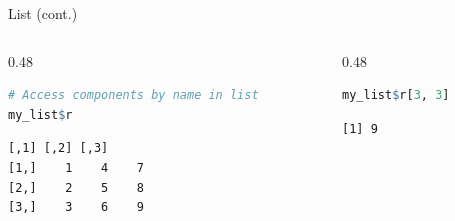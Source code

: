 \begin{frame}[fragile]{List (cont.)}
\begin{columns}[T]
\begin{column}{0.48\textwidth}
\begin{lstlisting}[language=R]
# Access components by name in list
my_list$r
\end{lstlisting}
\begin{lstlisting}[style=output]
     [,1] [,2] [,3]
[1,]    1    4    7
[2,]    2    5    8
[3,]    3    6    9
\end{lstlisting}
\end{column}
\begin{column}{0.48\textwidth}
\begin{lstlisting}[language=R]
my_list$r[3, 3]
\end{lstlisting}
\begin{lstlisting}[style=output]
[1] 9
\end{lstlisting}
\end{column}
\end{columns}
\end{frame}

